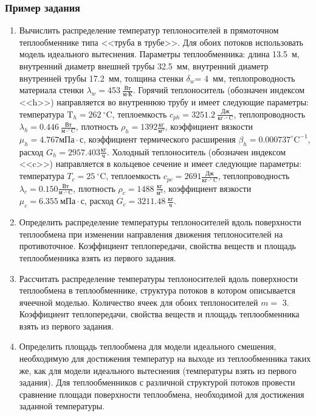 \subsubsection*{Пример задания}
\begin{enumerate}
\item Вычислить распределение температур теплоносителей в прямоточном теплообменнике типа <<труба в трубе>>. Для обоих потоков использовать модель идеального вытеснения. Параметры теплообменника: длина  13.5~м, внутренний диаметр внешней трубы 32.5~мм,  внутренний диаметр внутренней трубы 17.2~мм, толщина стенки $\delta_{w}$=     4~мм,  теплопроводность материала стенки $\lambda_{w}=  453~\frac{\text{Вт}}{\text{м} \cdot \text{К}}$.  Горячий теплоноситель (обозначен индексом <<h>>) направляется во внутреннюю трубу и	 имеет следующие параметры: температура $\text{T}_{h}= 262~^\circ\mathrm{C}$, теплоемкость	  $c_{p{h}}= 3251.2~\frac{\text{Дж}}{\text{кг} \cdot ^\circ\mathrm{C}}$, теплопроводность 		$\lambda_{h}= 0.446~\frac{\text{Вт}}{\text{м} \cdot ^\circ\mathrm{C}}$, плотность 		$\rho_{h}= 1392 \frac{\text{кг}}{\text{м}^3}$, коэффициент вязкости $\mu_{h}=4.767 \text{мПа} 		\cdot \text{с} $, коэффициент термического расширения $\beta_{h}=0.000737 ^\circ\mathrm{C}^{-1}$,		 расход $G_{h}= 2957.403 \frac{\text{кг}}{\text{ч}}$. Холодный теплоноситель (обозначен индексом <<c>>) 		 направляется в кольцевое сечение и имеет следующие параметры: температура $T_{c}=   25		 ~^\circ\mathrm{C}$, теплоемкость $c_{p{c}}= 2691 \frac{\text{Дж}}{\text{кг} \cdot ^\circ\mathrm{C}}$,			 теплопроводность $\lambda_{c}=0.150 \frac{\text{Вт}}{\text{м} \cdot ^\circ\mathrm{C}}$, плотность 			 $\rho_{c}=  1488~\frac{\text{кг}}{\text{м}^3}$, коэффициент вязкости $\mu_{c}=6.355~\text{мПа} \cdot \text{с} $, 			 расход $G_{c}=3211.48~\frac{\text{кг}}{\text{ч}}$. 

\item Определить распределение температуры теплоносителей вдоль поверхности теплообмена при изменении направления движения теплоносителей на противоточное. Коэффициент теплопередачи, свойства веществ и площадь теплообменника взять из первого задания.

\item Рассчитать распределение температуры теплоносителей вдоль поверхности теплообмена в теплообменнике, структура потоков в котором описывается ячеечной моделью. Количество ячеек для обоих теплоносителей $m = $ 3. Коэффициент теплопередачи, свойства веществ и площадь теплообменника взять из первого задания.

\item Определить площадь теплообмена для модели идеального смешения, необходимую для достижения температур на выходе из теплообменника таких же, как для модели идеального вытеснения (температуры взять из первого задания).
Для теплообменников с различной структурой потоков провести сравнение площади поверхности теплообмена, необходимой для достижения заданной температуры.
\end{enumerate}